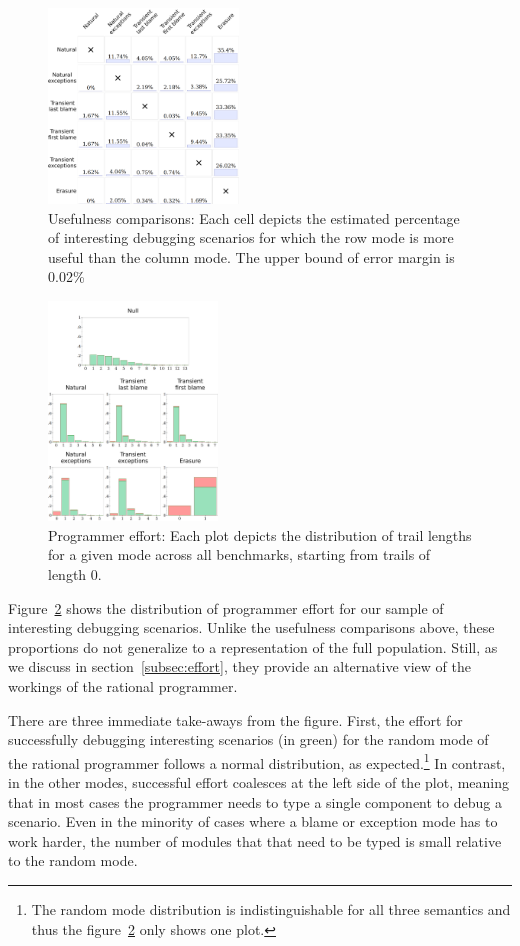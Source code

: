 \begin{figure}
  \centering
  \includegraphics[width=0.45\textwidth]{./plots/avo-matrix}
  \caption{Usefulness comparisons: Each cell depicts the estimated percentage of
  interesting debugging scenarios for which the row mode is more useful
  than the column mode.
  The upper bound of error margin is 0.02\%}
  \label{fig:avo-matrix}
\end{figure}


\begin{figure}
  \centering
  \includegraphics[width=0.4\textwidth]{./plots/bt-lengths-table}
  \caption{Programmer effort: Each plot depicts the distribution of trail
  lengths for a given mode across all benchmarks, starting from trails
  of length 0.}
  \label{fig:effort-table}
\end{figure}


Figure~\ref{fig:effort-table} shows the distribution of programmer effort
for our sample of interesting debugging scenarios. Unlike the usefulness
comparisons above, these proportions do not generalize to a representation of the full population.
Still, as we discuss in section~\ref{subsec:effort}, they provide an
alternative view of the workings of the rational programmer. 

There are
three immediate take-aways from the figure. First, the effort for successfully
debugging interesting scenarios (in green) for the random mode of the
rational programmer follows  a normal distribution, as expected.\footnote{The
random mode distribution is indistinguishable for all three semantics and thus the figure~\ref{fig:effort-table} 
only shows one plot.} In contrast, in the other modes, successful effort coalesces at
the left side of the plot, meaning that in most cases the programmer needs
to type a single component to debug a scenario. Even in the minority of
cases where a blame or exception mode has to work harder, the number of
modules that that need to be typed is small relative to the random mode. 

